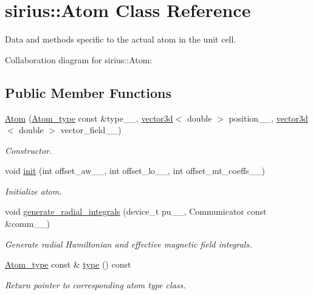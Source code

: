 \hypertarget{classsirius_1_1_atom}{}\section{sirius\+:\+:Atom Class Reference}
\label{classsirius_1_1_atom}


Data and methods specific to the actual atom in the unit cell.  




Collaboration diagram for sirius\+:\+:Atom\+:
\subsection*{Public Member Functions}
\begin{DoxyCompactItemize}
\item 
\hyperlink{classsirius_1_1_atom_a8463863f95273d4b427c362e881a957b}{Atom} (\hyperlink{classsirius_1_1_atom__type}{Atom\+\_\+type} const \&type\+\_\+\+\_\+, \hyperlink{classgeometry3d_1_1vector3d}{vector3d}$<$ double $>$ position\+\_\+\+\_\+, \hyperlink{classgeometry3d_1_1vector3d}{vector3d}$<$ double $>$ vector\+\_\+field\+\_\+\+\_\+)
\begin{DoxyCompactList}\small\item\em Constructor. \end{DoxyCompactList}\item 
void \hyperlink{classsirius_1_1_atom_a068f744622459832ce511bfd91e1a675}{init} (int offset\+\_\+aw\+\_\+\+\_\+, int offset\+\_\+lo\+\_\+\+\_\+, int offset\+\_\+mt\+\_\+coeffs\+\_\+\+\_\+)
\begin{DoxyCompactList}\small\item\em Initialize atom. \end{DoxyCompactList}\item 
void \hyperlink{classsirius_1_1_atom_af038cd608c577fd98a6e80cd47fa7072}{generate\+\_\+radial\+\_\+integrals} (device\+\_\+t pu\+\_\+\+\_\+, Communicator const \&comm\+\_\+\+\_\+)
\begin{DoxyCompactList}\small\item\em Generate radial Hamiltonian and effective magnetic field integrals. \end{DoxyCompactList}\item 
\hyperlink{classsirius_1_1_atom__type}{Atom\+\_\+type} const \& \hyperlink{classsirius_1_1_atom_a4f2a022815040e3da1f7ec766d5a5de8}{type} () const 
\begin{DoxyCompactList}\small\item\em Return pointer to corresponding atom type class. \end{DoxyCompactList}\item 

\end{DoxyCompactItemize}
